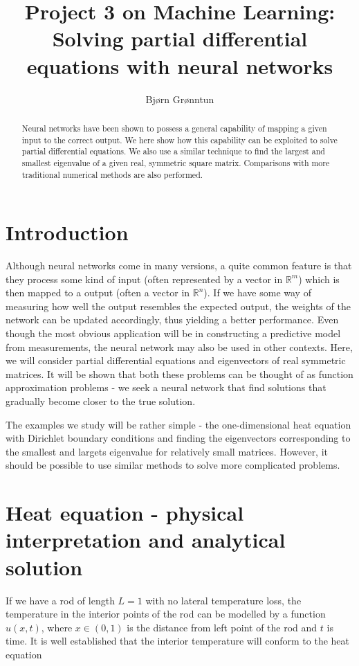 \documentclass{article}
\title{Project 3 on Machine Learning: Solving partial differential equations with neural networks}
\author{Bj{\o}rn Gr{\o}nntun}
\begin{document}
\maketitle

\begin{abstract}
    Neural networks have been shown to possess a general capability of mapping a given input to the correct output. We here show how this capability can be exploited to solve partial differential equations. We also use a similar technique to find the largest and smallest eigenvalue of a given real, symmetric square matrix. Comparisons with more traditional numerical methods are also performed.
\end{abstract}

\section{Introduction}
Although neural networks come in many versions, a quite common feature is that they process some kind of input (often represented by a vector in $\mathbb{R}^m$) which is then mapped to a output (often a vector in $\mathbb{R}^n$). If we have some way of measuring how well the output resembles the expected output, the weights of the network can be updated accordingly, thus yielding a better performance. Even though the most obvious application will be in constructing a predictive model from measurements, the neural network may also be used in other contexts. Here, we will consider partial differential equations and eigenvectors of real symmetric matrices. It will be shown that both these problems can be thought of as function approximation problems - we seek a neural network that find solutions that gradually become closer to the true solution.

The examples we study will be rather simple - the one-dimensional heat equation with Dirichlet boundary conditions and finding the eigenvectors corresponding to the smallest and largets eigenvalue for relatively small matrices. However, it should be possible to use similar methods to solve more complicated problems.

\section{Heat equation - physical interpretation and analytical solution}
If we have a rod of length $L=1$ with no lateral temperature loss, the temperature in the interior points of the rod can be modelled by a function $u(x, t)$, where $x\in (0, 1)$ is the distance from left point of the rod and $t$ is time. It is well established that the interior temperature will conform to the heat equation
\end{document}
